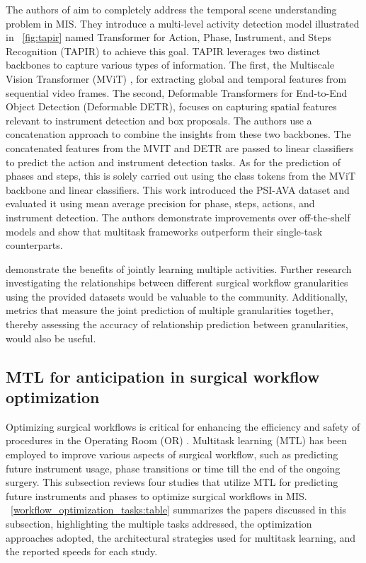 \documentclass[times,twocolumn,final]{elsarticle}
\renewcommand{\cite}[1]{\citep{#1}}
\newcommand{\figref}[1]{\figurename~\ref{#1}}
\newcommand{\tabref}[1]{\tablename~\ref{#1}}
\begin{document}
The authors of \citet{holistic_scene_understanding} aim to completely address the temporal scene understanding problem in MIS.
They introduce a multi-level activity detection model illustrated in \figref{fig:tapir} named Transformer for Action, Phase, Instrument, and Steps Recognition (TAPIR) to achieve this goal.
TAPIR leverages two distinct backbones to capture various types of information. The first, the Multiscale Vision Transformer (MViT) \citep{fan2021multiscale}, for extracting global and temporal features from sequential video frames. The second, Deformable Transformers for End-to-End Object Detection (Deformable DETR), focuses on capturing spatial features relevant to instrument detection and box proposals.
The authors use a concatenation approach to combine the insights from these two backbones. The concatenated features from the MVIT and DETR are passed to linear classifiers to predict the action and instrument detection tasks. As for the prediction of phases and steps, this is solely carried out using the class tokens from the MViT backbone and linear classifiers. This work introduced the PSI-AVA dataset and evaluated it using mean average precision for phase, steps, actions, and instrument detection. The authors demonstrate improvements over off-the-shelf models and show that multitask frameworks outperform their single-task counterparts.


\citet{holistic_scene_understanding,Ramesh2021_phase_step_gastric_bypass} demonstrate the benefits of jointly learning multiple activities. Further research investigating the relationships between different surgical workflow granularities using the provided datasets would be valuable to the community. Additionally, metrics that measure the joint prediction of multiple granularities together, thereby assessing the accuracy of relationship prediction between granularities, would also be useful.



\subsection{MTL for anticipation in surgical workflow optimization}
Optimizing surgical workflows is critical for enhancing the efficiency and safety of procedures in the Operating Room (OR) \cite{yuan2022anticipation}. Multitask learning (MTL) has been employed to improve various aspects of surgical workflow, such as predicting future instrument usage, phase transitions or time till the end of the ongoing surgery. This subsection reviews four studies that utilize MTL for predicting future instruments and phases to optimize surgical workflows in MIS.
\tabref{workflow_optimization_tasks:table} summarizes the papers discussed in this subsection, highlighting the multiple tasks addressed, the optimization approaches adopted, the architectural strategies used for multitask learning, and the reported speeds for each study.
\end{document}
